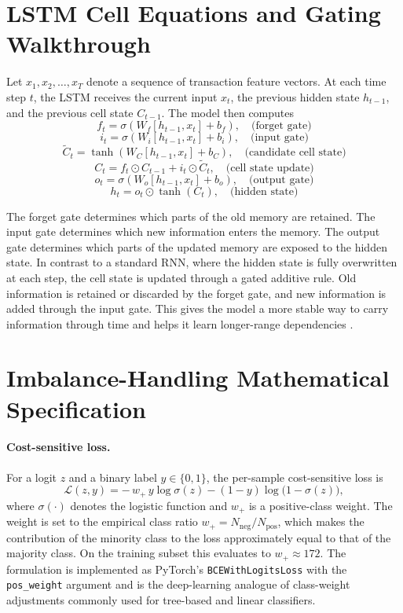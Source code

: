 \documentclass[oneside,12pt,parskip=half,american,numbers=noenddot]{scrreprt}
\begin{document}
\section{LSTM Cell Equations and Gating Walkthrough}
\label{app:lstm_eq}

Let $x_1, x_2, \dots, x_T$ denote a sequence of transaction feature vectors. At each time step $t$, the LSTM receives the current input $x_t$, the previous hidden state $h_{t-1}$, and the previous cell state $C_{t-1}$. The model then computes
\[
f_t = \sigma \left( W_f [h_{t-1}, x_t] + b_f \right), \quad \text{(forget gate)}
\]
\[
i_t = \sigma \left( W_i [h_{t-1}, x_t] + b_i \right), \quad \text{(input gate)}
\]
\[
\tilde{C}_t = \tanh \left( W_C [h_{t-1}, x_t] + b_C \right), \quad \text{(candidate cell state)}
\]
\[
C_t = f_t \odot C_{t-1} + i_t \odot \tilde{C}_t, \quad \text{(cell state update)}
\]
\[
o_t = \sigma \left( W_o [h_{t-1}, x_t] + b_o \right), \quad \text{(output gate)}
\]
\[
h_t = o_t \odot \tanh(C_t), \quad \text{(hidden state)}
\]

The forget gate determines which parts of the old memory are retained. The input gate determines which new information enters the memory. The output gate determines which parts of the updated memory are exposed to the hidden state. In contrast to a standard RNN, where the hidden state is fully overwritten at each step, the cell state is updated through a gated additive rule. Old information is retained or discarded by the forget gate, and new information is added through the input gate. This gives the model a more stable way to carry information through time and helps it learn longer-range dependencies \parencite{olah_understanding_2015}.


\section{Imbalance-Handling Mathematical Specification}
\label{app:imbalance_math}

\paragraph{Cost-sensitive loss.} For a logit $z$ and a binary label $y \in \{0, 1\}$, the per-sample cost-sensitive loss is
\[
\mathcal{L}(z, y) = -\,w_{+}\, y \log \sigma(z) - (1 - y) \log\!\bigl(1 - \sigma(z)\bigr),
\]
where $\sigma(\cdot)$ denotes the logistic function and $w_{+}$ is a positive-class weight. The weight is set to the empirical class ratio $w_{+} = N_{\text{neg}} / N_{\text{pos}}$, which makes the contribution of the minority class to the loss approximately equal to that of the majority class. On the training subset this evaluates to $w_{+} \approx 172$. The formulation is implemented as PyTorch's \texttt{BCEWithLogitsLoss} with the \texttt{pos\_weight} argument and is the deep-learning analogue of class-weight adjustments commonly used for tree-based and linear classifiers.
\end{document}

